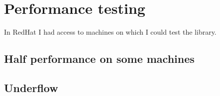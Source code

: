 \chapter{Performance testing} \label{sec:performance}
In RedHat I had access to machines on which I could test the library. 


\section{Half performance on some machines}

\section{Underflow}

